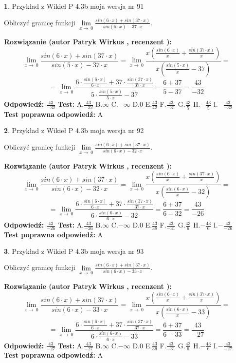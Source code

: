 \documentclass[12pt, a4paper]{article}
\theoremstyle{definition} %
\newtheorem{zad}{}
\newcommand{\zadStart}[1]{\begin{zad}#1\newline}
\newcommand{\zadStop}{\end{zad}}
\newcommand{\rozwStart}[2]{\noindent \textbf{Rozwiązanie (autor #1 , recenzent #2): }\newline}
\newcommand{\rozwStop}{\newline}
\newcommand{\odpStart}{\noindent \textbf{Odpowiedź:}\newline}
\newcommand{\odpStop}{\newline}
\newcommand{\testStart}{\noindent \textbf{Test:}\newline}
\newcommand{\testStop}{\newline}
\newcommand{\kluczStart}{\noindent \textbf{Test poprawna odpowiedź:}\newline}
\newcommand{\kluczStop}{\newline}
\begin{document}
\zadStart{Przykład z Wikieł P 4.3b moja wersja nr 91}


Obliczyć granicę funkcji $\lim\limits_{x\to\ 0}\frac{sin(6 \cdot x)+sin(37 \cdot x)}{sin(5 \cdot x)-37 \cdot x}$.
\zadStop
\rozwStart{Patryk Wirkus}{}
$$\lim\limits_{x\to\ 0}\frac{sin(6 \cdot x)+sin(37 \cdot x)}{sin(5 \cdot x)-37 \cdot x}=\lim\limits_{x\to\ 0}\frac{x(\frac{sin(6 \cdot x)}{x}+\frac{sin(37 \cdot x)}{x})}{x(\frac{sin(5 \cdot x)}{x}-37)}=$$
$$=\lim\limits_{x\to\ 0}\frac{6 \cdot \frac{sin(6 \cdot x)}{6 \cdot x}+37 \cdot \frac{sin(37 \cdot x)}{37 \cdot x}}{5 \cdot \frac{sin(5 \cdot x)}{5 \cdot x}-37}=\frac{6+37}{5-37} = \frac{43}{-32}$$
\rozwStop
\odpStart
$\frac{43}{-32}$
\odpStop
\testStart
A.$\frac{43}{-32}$
B.$\infty$
C.$-\infty$
D.$0$
E.$\frac{43}{42}$
F.$\frac{43}{-31}$
G.$\frac{43}{5}$
H.$-\frac{43}{5}$
I.$-\frac{43}{-32}$
\testStop
\kluczStart
A
\kluczStop



\zadStart{Przykład z Wikieł P 4.3b moja wersja nr 92}


Obliczyć granicę funkcji $\lim\limits_{x\to\ 0}\frac{sin(6 \cdot x)+sin(37 \cdot x)}{sin(6 \cdot x)-32 \cdot x}$.
\zadStop
\rozwStart{Patryk Wirkus}{}
$$\lim\limits_{x\to\ 0}\frac{sin(6 \cdot x)+sin(37 \cdot x)}{sin(6 \cdot x)-32 \cdot x}=\lim\limits_{x\to\ 0}\frac{x(\frac{sin(6 \cdot x)}{x}+\frac{sin(37 \cdot x)}{x})}{x(\frac{sin(6 \cdot x)}{x}-32)}=$$
$$=\lim\limits_{x\to\ 0}\frac{6 \cdot \frac{sin(6 \cdot x)}{6 \cdot x}+37 \cdot \frac{sin(37 \cdot x)}{37 \cdot x}}{6 \cdot \frac{sin(6 \cdot x)}{6 \cdot x}-32}=\frac{6+37}{6-32} = \frac{43}{-26}$$
\rozwStop
\odpStart
$\frac{43}{-26}$
\odpStop
\testStart
A.$\frac{43}{-26}$
B.$\infty$
C.$-\infty$
D.$0$
E.$\frac{43}{38}$
F.$\frac{43}{-31}$
G.$\frac{43}{6}$
H.$-\frac{43}{6}$
I.$-\frac{43}{-26}$
\testStop
\kluczStart
A
\kluczStop



\zadStart{Przykład z Wikieł P 4.3b moja wersja nr 93}


Obliczyć granicę funkcji $\lim\limits_{x\to\ 0}\frac{sin(6 \cdot x)+sin(37 \cdot x)}{sin(6 \cdot x)-33 \cdot x}$.
\zadStop
\rozwStart{Patryk Wirkus}{}
$$\lim\limits_{x\to\ 0}\frac{sin(6 \cdot x)+sin(37 \cdot x)}{sin(6 \cdot x)-33 \cdot x}=\lim\limits_{x\to\ 0}\frac{x(\frac{sin(6 \cdot x)}{x}+\frac{sin(37 \cdot x)}{x})}{x(\frac{sin(6 \cdot x)}{x}-33)}=$$
$$=\lim\limits_{x\to\ 0}\frac{6 \cdot \frac{sin(6 \cdot x)}{6 \cdot x}+37 \cdot \frac{sin(37 \cdot x)}{37 \cdot x}}{6 \cdot \frac{sin(6 \cdot x)}{6 \cdot x}-33}=\frac{6+37}{6-33} = \frac{43}{-27}$$
\rozwStop
\odpStart
$\frac{43}{-27}$
\odpStop
\testStart
A.$\frac{43}{-27}$
B.$\infty$
C.$-\infty$
D.$0$
E.$\frac{43}{39}$
F.$\frac{43}{-31}$
G.$\frac{43}{6}$
H.$-\frac{43}{6}$
I.$-\frac{43}{-27}$
\testStop
\kluczStart
A
\kluczStop
\end{document}

